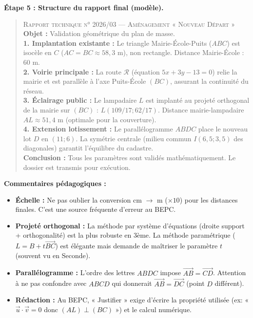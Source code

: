 \documentclass[11pt]{article}
\begin{document}
\begin{exoresolu}
\textbf{Étape 5 : Structure du rapport final (modèle).}
\begin{quote}
\textsc{Rapport technique n° 2026/03 — Aménagement « Nouveau Départ »}\\
\textbf{Objet :} Validation géométrique du plan de masse.\\
\textbf{1. Implantation existante :} Le triangle Mairie-École-Puits ($ABC$) est isocèle en $C$ ($AC=BC\approx 58,3$ m), non rectangle. Distance Mairie-École : 60 m.\\
\textbf{2. Voirie principale :} La route $\mathcal{R}$ (équation $5x+3y-13=0$) relie la mairie et est parallèle à l'axe Puits-École $(BC)$, assurant la continuité du réseau.\\
\textbf{3. Éclairage public :} Le lampadaire $L$ est implanté au projeté orthogonal de la mairie sur $(BC)$ : $L(109/17;62/17)$. Distance mairie-lampadaire $AL \approx 51,4$ m (optimale pour la couverture).\\
\textbf{4. Extension lotissement :} Le parallélogramme $ABDC$ place le nouveau lot $D$ en $(11;6)$. La symétrie centrale (milieu commun $I(6,5;3,5)$ des diagonales) garantit l'équilibre du cadastre.\\
\textbf{Conclusion :} Tous les paramètres sont validés mathématiquement. Le dossier est transmis pour exécution.
\end{quote}
\tcblower
\textbf{Commentaires pédagogiques :}
\begin{itemize}
    \item \textbf{Échelle :} Ne pas oublier la conversion cm $\to$ m ($\times 10$) pour les distances finales. C'est une source fréquente d'erreur au BEPC.
    \item \textbf{Projeté orthogonal :} La méthode par système d'équations (droite support + orthogonalité) est la plus robuste en 3ème. La méthode paramétrique ($L = B + t\vec{BC}$) est élégante mais demande de maîtriser le paramètre $t$ (souvent vu en Seconde).
    \item \textbf{Parallélogramme :} L'ordre des lettres $ABDC$ impose $\vec{AB}=\vec{CD}$. Attention à ne pas confondre avec $ABCD$ qui donnerait $\vec{AB}=\vec{DC}$ (point $D$ différent).
    \item \textbf{Rédaction :} Au BEPC, « Justifier » exige d'écrire la propriété utilisée (ex: « $\vec{u}\cdot\vec{v}=0$ donc $(AL)\perp(BC)$ ») et le calcul numérique.
\end{itemize}
\end{exoresolu}
\end{document}
